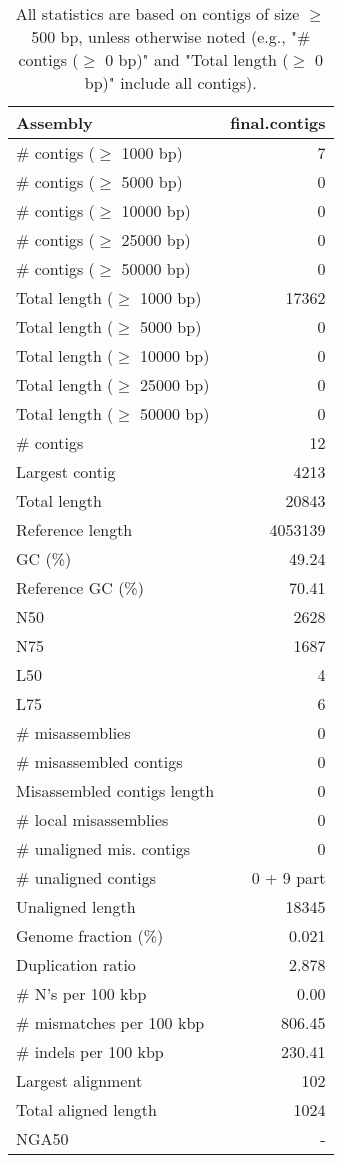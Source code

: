 \documentclass[12pt,a4paper]{article}
\begin{document}
\begin{table}[ht]
\begin{center}
\caption{All statistics are based on contigs of size $\geq$ 500 bp, unless otherwise noted (e.g., "\# contigs ($\geq$ 0 bp)" and "Total length ($\geq$ 0 bp)" include all contigs).}
\begin{tabular}{|l*{1}{|r}|}
\hline
Assembly & final.contigs \\ \hline
\# contigs ($\geq$ 1000 bp) & 7 \\ \hline
\# contigs ($\geq$ 5000 bp) & 0 \\ \hline
\# contigs ($\geq$ 10000 bp) & 0 \\ \hline
\# contigs ($\geq$ 25000 bp) & 0 \\ \hline
\# contigs ($\geq$ 50000 bp) & 0 \\ \hline
Total length ($\geq$ 1000 bp) & 17362 \\ \hline
Total length ($\geq$ 5000 bp) & 0 \\ \hline
Total length ($\geq$ 10000 bp) & 0 \\ \hline
Total length ($\geq$ 25000 bp) & 0 \\ \hline
Total length ($\geq$ 50000 bp) & 0 \\ \hline
\# contigs & 12 \\ \hline
Largest contig & 4213 \\ \hline
Total length & 20843 \\ \hline
Reference length & 4053139 \\ \hline
GC (\%) & 49.24 \\ \hline
Reference GC (\%) & 70.41 \\ \hline
N50 & 2628 \\ \hline
N75 & 1687 \\ \hline
L50 & 4 \\ \hline
L75 & 6 \\ \hline
\# misassemblies & 0 \\ \hline
\# misassembled contigs & 0 \\ \hline
Misassembled contigs length & 0 \\ \hline
\# local misassemblies & 0 \\ \hline
\# unaligned mis. contigs & 0 \\ \hline
\# unaligned contigs & 0 + 9 part \\ \hline
Unaligned length & 18345 \\ \hline
Genome fraction (\%) & 0.021 \\ \hline
Duplication ratio & 2.878 \\ \hline
\# N's per 100 kbp & 0.00 \\ \hline
\# mismatches per 100 kbp & 806.45 \\ \hline
\# indels per 100 kbp & 230.41 \\ \hline
Largest alignment & 102 \\ \hline
Total aligned length & 1024 \\ \hline
NGA50 & - \\ \hline
\end{tabular}
\end{center}
\end{table}
\end{document}
